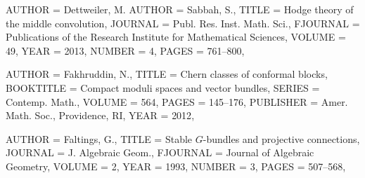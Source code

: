 \begin{bibdiv}
\begin{biblist}
{ %
}
\fi

{} {
    AUTHOR = {Dettweiler, M.}
    AUTHOR =  {Sabbah, S.},
     TITLE = {Hodge theory of the middle convolution},
   JOURNAL = {Publ. Res. Inst. Math. Sci.},
  FJOURNAL = {Publications of the Research Institute for Mathematical
              Sciences},
    VOLUME = {49},
      YEAR = {2013},
    NUMBER = {4},
     PAGES = {761--800},
}


 {
    AUTHOR = {Fakhruddin, N.},
     TITLE = {Chern classes of conformal blocks},
 BOOKTITLE = {Compact moduli spaces and vector bundles},
    SERIES = {Contemp. Math.},
    VOLUME = {564},
     PAGES = {145--176},
 PUBLISHER = {Amer. Math. Soc., Providence, RI},
      YEAR = {2012},
}

 {
    AUTHOR = {Faltings, G.},
     TITLE = {Stable {$G$}-bundles and projective connections},
   JOURNAL = {J. Algebraic Geom.},
  FJOURNAL = {Journal of Algebraic Geometry},
    VOLUME = {2},
      YEAR = {1993},
    NUMBER = {3},
     PAGES = {507--568},
}




\end{biblist}
\end{bibdiv}
